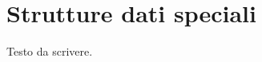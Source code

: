 
\ifsubfile
\usepackage{../settings/subfile}
\setcounter{chapter}{11}


\fi
\chapter{Strutture dati speciali}

Testo da scrivere.

\ifsubfile

\fi
